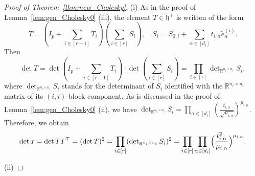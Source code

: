 \documentclass[12pt]{amsart}
\theoremstyle{plain}
\theoremstyle{definition}
\theoremstyle{remark}
\newcommand{\R}{\mathbb{R}}
\newcommand{\1}{\mathbf{1}}
\begin{document}
\begin{proof}[Proof of Theorem~\ref{thm:new_Cholesky}]
(i)
As in the proof of Lemma~\ref{lem:gen_Cholesky0} (iii), 
 the element $T \in \mathfrak{h}^+$ is written of the form
$$
T = (I_p + \sum_{i \in [r-1]} T_i)(\sum_{i \in [r]} S_i), \quad
 S_i = S_{0,i} + \sum_{\alpha \in [d_i]} t_{i,\alpha} \tilde{e}^{(i)}_\alpha.   
$$
Then 
$$
\det T = \det (I_p + \sum_{i \in [r-1]} T_i) \cdot \det(\sum_{i \in [r]} S_i) = \prod_{i \in [r]} \det\nolimits_{\R^{n_i \times n_i}} S_i,
$$
 where $\det_{\R^{n_i \times n_i}} S_i$ stands for the determinant
  of $S_i$ identified with the $\R^{n_i \times n_i}$ matrix of its $(i,i)$-block component. 
As is discussed in the proof of Lemma~\ref{lem:gen_Cholesky0} (ii), 
 we have
 $\det_{\R^{n_i \times n_i}} S_i
  = \prod_{\alpha \in [d_i]} (\frac{t_{i,\alpha}}{\sqrt{\mu_{i,\alpha}} } )^{\mu_{i,\alpha}}$.
Therefore, we obtain
\[
\det x = \det TT^\top = (\det T)^2
 =  \prod_{i\in[r]} ( \det\nolimits_{\R^{n_i \times n_i}} S_i )^2 
= \prod_{i \in [r]} \prod_{\alpha \in [d_i]} \Bigl( \frac{t_{i,\alpha}^2}{\mu_{i,\alpha} } \Bigr)^{\mu_{i,\alpha}}.
\]


(ii) 


\end{proof}
\end{document}
